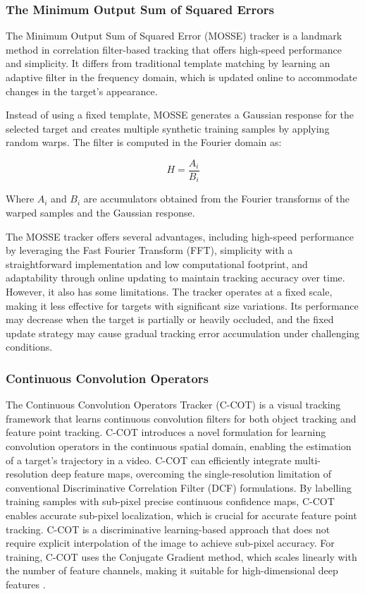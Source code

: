 \documentclass[11pt, letterpaper]{article}
\begin{document}
\subsubsection{The Minimum Output Sum of Squared Errors}

The Minimum Output Sum of Squared Error (MOSSE) tracker is a landmark method in correlation filter-based tracking that offers high-speed performance and simplicity. It differs from traditional template matching by learning an adaptive filter in the frequency domain, which is updated online to accommodate changes in the target's appearance.

Instead of using a fixed template, MOSSE generates a Gaussian response for the selected target and creates multiple synthetic training samples by applying random warps. The filter is computed in the Fourier domain as:

\begin{equation}
  H = \frac{A_i}{B_i}
\end{equation}

Where $A_i$ and $B_i$ are accumulators obtained from the Fourier transforms of the warped samples and the Gaussian response.

The MOSSE tracker offers several advantages, including high-speed performance by leveraging the Fast Fourier Transform (FFT), simplicity with a straightforward implementation and low computational footprint, and adaptability through online updating to maintain tracking accuracy over time. However, it also has some limitations. The tracker operates at a fixed scale, making it less effective for targets with significant size variations. Its performance may decrease when the target is partially or heavily occluded, and the fixed update strategy may cause gradual tracking error accumulation under challenging conditions.

\subsubsection{Continuous Convolution Operators}

The Continuous Convolution Operators Tracker (C-COT) is a visual tracking framework that learns continuous convolution filters for both object tracking and feature point tracking. C-COT introduces a novel formulation for learning convolution operators in the continuous spatial domain, enabling the estimation of a target's trajectory in a video. C-COT can efficiently integrate multi-resolution deep feature maps, overcoming the single-resolution limitation of conventional Discriminative Correlation Filter (DCF) formulations. By labelling training samples with sub-pixel precise continuous confidence maps, C-COT enables accurate sub-pixel localization, which is crucial for accurate feature point tracking. C-COT is a discriminative learning-based approach that does not require explicit interpolation of the image to achieve sub-pixel accuracy. For training, C-COT uses the Conjugate Gradient method, which scales linearly with the number of feature channels, making it suitable for high-dimensional deep features \cite{danelljan_beyond_2016}.
\end{document}

